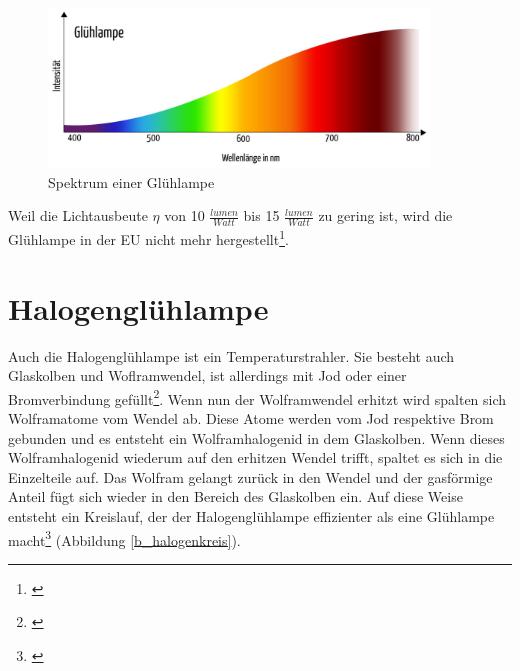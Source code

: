 \begin{figure}[H]     %
\centering
\includegraphics[width=0.9\textwidth]{bilder/halogen} 
\caption {Spektrum einer Glühlampe\protect\footnotemark}\label{b_halogen}
\end{figure}

Weil die Lichtausbeute $\eta$ von 10 $\frac{lumen}{Watt}$ bis 15 $\frac{lumen}{Watt}$ zu gering ist, wird die Glühlampe in der EU nicht mehr hergestellt\footnote{\cite[78]{ris}}.
 
\section{Halogenglühlampe} \label{sec_halogenglühlampe}
Auch die Halogenglühlampe ist ein Temperaturstrahler. Sie besteht auch Glaskolben und Woflramwendel, ist allerdings mit Jod oder einer Bromverbindung gefüllt\footnote{\cite[82]{ris}}.
Wenn nun der Wolframwendel erhitzt wird spalten sich Wolframatome vom Wendel ab. Diese Atome werden vom Jod respektive Brom gebunden und es entsteht ein Wolframhalogenid in dem Glaskolben. Wenn dieses Wolframhalogenid wiederum auf den erhitzen Wendel trifft, spaltet es sich in die Einzelteile auf. Das Wolfram gelangt zurück in den Wendel und der gasförmige Anteil fügt sich wieder in den Bereich des Glaskolben ein. Auf diese Weise entsteht ein Kreislauf, der der Halogenglühlampe effizienter als eine Glühlampe macht\footnote{\cite[83-84]{ris}} (Abbildung \ref{b_halogenkreis}).

